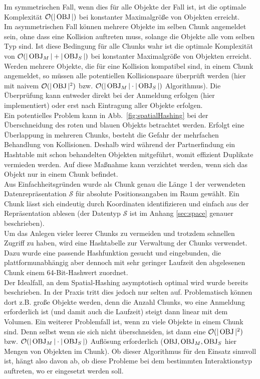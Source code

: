 Im symmetrischen Fall, wenn dies für alle Objekte der Fall ist, ist die optimale Komplexität $\mathcal{O}(|\operatorname{OBJ}|)$  bei konstanter Maximalgröße von Objekten erreicht.\\
Im asymmetrischen Fall können mehrere Objekte im selben Chunk angemeldet sein, ohne dass eine Kollision auftreten muss, solange die Objekte alle vom selben Typ sind. Ist diese Bedingung für alle Chunks wahr ist die optimale Komplexität von $\mathcal{O}(|\operatorname{OBJ}_M|+|\operatorname{OBJ}_S|)$ bei konstanter Maximalgröße von Objekten erreicht. \\
Werden mehrere Objekte, die für eine Kollision kompatibel sind, in einem Chunk angemeldet, so müssen alle potentiellen Kollisionspaare überprüft werden (hier mit naivem $\mathcal{O}(|\operatorname{OBJ}|^2)$ bzw. $\mathcal{O}(|\operatorname{OBJ}_M|\cdot |\operatorname{OBJ}_S|)$ Algorithmus). Die Überprüfung kann entweder direkt bei der Anmeldung erfolgen (hier implementiert) oder erst nach Eintragung aller Objekte erfolgen.\\
Ein potentielles Problem kann in Abb.~\ref{fig:spatialHashing} bei der Überschneidung des roten und blauen Objekts betrachtet werden. Erfolgt eine Überlappung in mehreren Chunks, besteht die Gefahr der mehrfachen Behandlung von Kollisionen. Deshalb wird während der Partnerfindung ein Hashtable mit schon behandelten Objekten mitgeführt, womit effizient Duplikate vermieden werden. Auf diese Maßnahme kann verzichtet werden, wenn sich das Objekt nur in einem Chunk befindet.\\
Aus Einfachheitsgründen wurde als Chunk genau die Länge 1 der verwendeten Datenrepräsentation $\mathcal{S}$ für absolute Positionsangaben im Raum gewählt. Ein Chunk lässt sich eindeutig durch Koordinaten identifizieren und einfach aus der Repräsentation ablesen (der Datentyp $\mathcal{S}$ ist im Anhang \ref{sec:space} genauer beschrieben).\\
Um das Anlegen vieler leerer Chunks zu vermeiden und trotzdem schnellen Zugriff zu haben, wird eine Hashtabelle zur Verwaltung der Chunks verwendet. Dazu wurde eine passende Hashfunktion gesucht und eingebunden, die plattformunabhängig aber dennoch mit sehr geringer Laufzeit den abgelesenen Chunk einem 64-Bit-Hashwert zuordnet.\\
Der Idealfall, an dem Spatial-Hashing asymptotisch optimal wird wurde bereits beschrieben. In der Praxis tritt dies jedoch nur selten auf. Problematisch können dort z.B. große Objekte werden, denn die Anzahl Chunks, wo eine Anmeldung erforderlich ist (und damit auch die Laufzeit) steigt dann linear mit dem Volumen. Ein weiterer Problemfall ist, wenn zu viele Objekte in einem Chunk sind. Denn selbst wenn sie sich nicht überschneiden, ist dann eine $\mathcal{O}(|\operatorname{OBJ}|^2)$ bzw. $\mathcal{O}(|\operatorname{OBJ}_M|\cdot |\operatorname{OBJ}_S|)$ Auflösung erforderlich ($\operatorname{OBJ}, \operatorname{OBJ}_M, \operatorname{OBJ}_S$ hier Mengen von Objekten im Chunk). Ob dieser Algorithmus für den Einsatz sinnvoll ist, hängt also davon ab, ob diese Probleme bei dem bestimmten Interaktionstyp auftreten, wo er eingesetzt werden soll.\\



